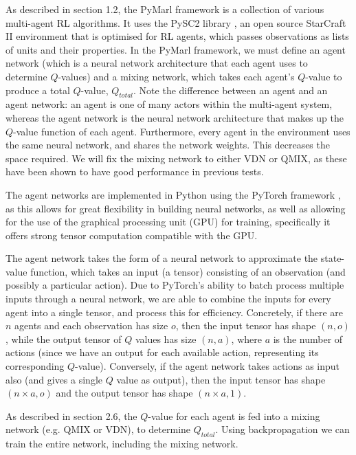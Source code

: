 As described in section 1.2, the PyMarl framework is a collection of various multi-agent RL algorithms. It uses the PySC2 library \cite{pysc2}, an open source StarCraft II environment that is optimised for RL agents, which passes observations as lists of units and their properties. In the PyMarl framework, we must define an agent network (which is a neural network architecture that each agent uses to determine $Q$-values) and a mixing network, which takes each agent's $Q$-value to produce a total $Q$-value, $Q_{total}$. Note the difference between an agent and an agent network: an agent is one of many actors within the multi-agent system, whereas the agent network is the neural network architecture that makes up the $Q$-value function of each agent. Furthermore, every agent in the environment uses the same neural network, and shares the network weights. This decreases the space required. We will fix the mixing network to either VDN or QMIX, as these have been shown to have good performance in previous tests. 

The agent networks are implemented in Python using the PyTorch framework \cite{pytorch}, as this allows for great flexibility in building neural networks, as well as allowing for the use of the graphical processing unit (GPU) for training, specifically it offers strong tensor computation compatible with the GPU.

The agent network takes the form of a neural network to approximate the state-value function, which takes an input (a tensor) consisting of an observation (and possibly a particular action). Due to PyTorch's ability to batch process multiple inputs through a neural network, we are able to combine the inputs for every agent into a single tensor, and process this for efficiency. Concretely, if there are $n$ agents and each observation has size $o$, then the input tensor has shape $(n, o)$, while the output tensor of $Q$ values has size $(n, a)$, where $a$ is the number of actions (since we have an output for each available action, representing its corresponding $Q$-value). Conversely, if the agent network takes actions as input also (and gives a single $Q$ value as output), then the input tensor has shape $(n \times a, o)$ and the output tensor has shape $(n \times a, 1)$.

As described in section 2.6, the $Q$-value for each agent is fed into a mixing network (e.g. QMIX or VDN), to determine $Q_{total}$. Using backpropagation we can train the entire network, including the mixing network.

